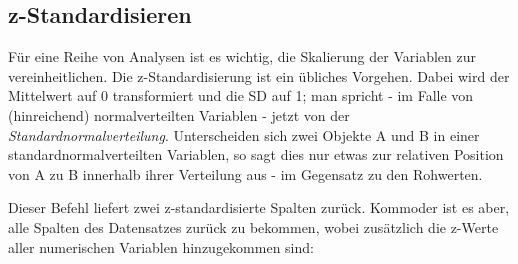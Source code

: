 \documentclass[12pt,]{book}
\newenvironment{Shaded}{\begin{snugshade}}{\end{snugshade}}
\newcommand{\KeywordTok}[1]{\textcolor[rgb]{0.13,0.29,0.53}{\textbf{{#1}}}}
\newcommand{\StringTok}[1]{\textcolor[rgb]{0.31,0.60,0.02}{{#1}}}
\newcommand{\CommentTok}[1]{\textcolor[rgb]{0.56,0.35,0.01}{\textit{{#1}}}}
\newcommand{\NormalTok}[1]{{#1}}
\begin{document}
\subsection{z-Standardisieren}\label{z-standardisieren}

Für eine Reihe von Analysen ist es wichtig, die Skalierung der Variablen
zur vereinheitlichen. Die z-Standardisierung ist ein übliches Vorgehen.
Dabei wird der Mittelwert auf 0 transformiert und die SD auf 1; man
spricht - im Falle von (hinreichend) normalverteilten Variablen - jetzt
von der \emph{Standardnormalverteilung}.
Unterscheiden sich zwei Objekte A und B in einer
standardnormalverteilten Variablen, so sagt dies nur etwas zur relativen
Position von A zu B innerhalb ihrer Verteilung aus - im Gegensatz zu den
Rohwerten.

\begin{Shaded}
\end{Shaded}

Dieser Befehl liefert zwei z-standardisierte Spalten zurück. Kommoder
ist es aber, alle Spalten des Datensatzes zurück zu bekommen, wobei
zusätzlich die z-Werte aller numerischen Variablen hinzugekommen sind:

\begin{Shaded}
\end{Shaded}
\end{document}
